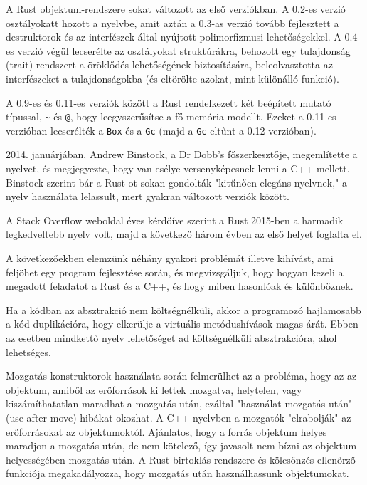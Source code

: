 A Rust objektum-rendszere sokat változott az első verziókban. A 0.2-es verzió osztályokatt hozott a nyelvbe, amit aztán a 0.3-as verzió tovább fejlesztett a destruktorok és az interfészek által nyújtott polimorfizmusi lehetőségekkel.
A 0.4-es verzió végül lecserélte az osztályokat struktúrákra, behozott egy tulajdonság (trait) rendszert a öröklődés lehetőségének biztosítására, 
beleolvasztotta az interfészeket a tulajdonságokba (és eltörölte azokat, mint különálló funkció).\cite{rust:version_history}

A 0.9-es és 0.11-es verziók között a Rust rendelkezett két beépített mutató típussal, \texttt{\~} és \texttt{@}, hogy leegyszerűsítse a fő memória modellt.
Ezeket a 0.11-es verzióban lecserélték a \texttt{Box} és a \texttt{Gc} (majd a \texttt{Gc} eltűnt a 0.12 verzióban).\cite{rust:version_history}

2014. januárjában, Andrew Binstock, a Dr Dobb's főszerkesztője, megemlítette a nyelvet, és megjegyezte, hogy van esélye versenyképesnek lenni a C++ mellett.
Binstock szerint bár a Rust-ot sokan gondolták "kitűnően elegáns nyelvnek," a nyelv használata lelassult, mert gyakran változott verziók között.\cite{dr_dobb}

A Stack Overflow weboldal éves kérdőíve szerint a Rust 2015-ben a harmadik legkedveltebb nyelv volt, majd a következő három évben az első helyet foglalta el.\cite{so_2015, so_2016, so_2017, so_2018}


A következőekben elemzünk néhány gyakori problémát illetve kihívást, ami feljöhet egy program fejlesztése során,
és megvizsgáljuk, hogy hogyan kezeli a megadott feladatot a Rust és a C++, és hogy miben hasonlóak és különböznek.


Ha a kódban az absztrakció nem költségnélküli, akkor a programozó hajlamosabb a kód-duplikációra, hogy elkerülje a virtuális metódushívások magas árát.
Ebben az esetben mindkettő nyelv lehetőséget ad költségnélküli absztrakcióra, ahol lehetséges.\cite{compare:cpp:zerocost, compare:rust:zerocost}

\label{subsec:ownership_mentioned}

Mozgatás konstruktorok használata során felmerülhet az a probléma, hogy az az objektum, amiből az erőforrások ki lettek mozgatva,
helytelen, vagy kiszámíthatatlan maradhat a mozgatás után, ezáltal "használat mozgatás után" (use-after-move) hibákat okozhat.
A C++ nyelvben a mozgatók "elrabolják" az erőforrásokat az objektumoktól. Ajánlatos, hogy a forrás objektum helyes maradjon a mozgatás után,
de nem kötelező, így javasolt nem bízni az objektum helyességében mozgatás után.\cite{compare:cpp:move_constructor}
A Rust birtoklás rendszere és kölcsönzés-ellenőrző funkciója megakadályozza, hogy mozgatás után használhassunk objektumokat.\cite{compare:rust:move_constructor}

